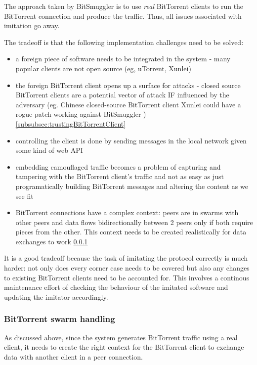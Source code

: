 \documentclass[11pt]{book} %
\newcommand{\projectName}{BitSmuggler }
\begin{document}
The approach taken by \projectName is to use \textit{real} BitTorrent clients to run the BitTorrent connection and produce the traffic. Thus, all issues associated with imitation go away.

The tradeoff is that the following implementation challenges need to be solved:
\begin{itemize}
\item a foreign piece of software needs to be integrated in the system - many popular clients are not open source (eg, uTorrent, Xunlei)
\item the foreign BitTorrent client opens up a surface for attacks - closed source BitTorrent clients are a potential vector of attack IF influenced by the adversary (eg. Chinese closed-source BitTorrent client Xunlei could have a rogue patch working against \projectName) \ref{subsubsec:trustingBitTorrentClient}
\item controlling the client is done by sending messages in the local network given some kind of web API
\item embedding camouflaged traffic becomes a problem of capturing and tampering with the BitTorrent client's traffic and not as easy as just programatically building BitTorrent messages and altering the content as we see fit
\item BitTorrent connections have a complex context: peers are in swarms with other peers and data flows bidirectionally between 2 peers only if both require pieces from the other. This context needs to be created realistically for data exchanges to work \ref{subsubsec:swarmHandling}
\end{itemize}

It is a good tradeoff because the task of imitating the protocol correctly is much harder: not only does every corner case needs to be covered but also any changes to existing BitTorrent clients need to be accounted for. This involves a continous maintenance effort of checking the behaviour of the imitated software and updating the imitator accordingly.

\subsubsection{BitTorrent swarm handling}
\label{subsubsec:swarmHandling}

As discussed above, since the system generates BitTorrent traffic using a real client, it needs to create the right context for the BitTorrent client to exchange data with another client in a peer connection.
\end{document}
